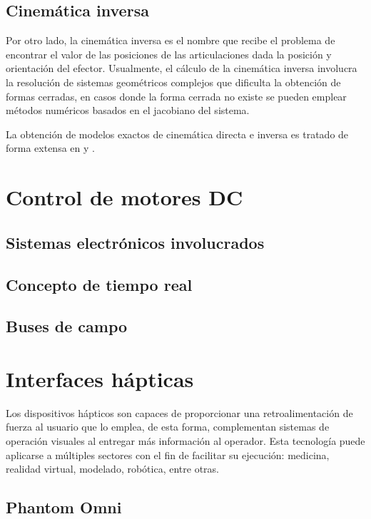\subsection{Cinemática inversa}

Por otro lado, la cinemática inversa es el nombre que recibe el problema de encontrar el valor de las posiciones de las articulaciones dada la posición y orientación del efector.
Usualmente, el cálculo de la cinemática inversa involucra la resolución de sistemas geométricos complejos que dificulta la obtención de formas cerradas, en casos donde la forma cerrada no existe se pueden emplear métodos numéricos basados en el jacobiano del sistema.

La obtención de modelos exactos de cinemática directa e inversa es tratado de forma extensa en \cite{cole2007} y \cite{predescu2015}.

\section{Control de motores DC}

\subsection{Sistemas electrónicos involucrados}

\subsection{Concepto de tiempo real}

\subsection{Buses de campo}

\section{Interfaces hápticas}

Los dispositivos hápticos son capaces de proporcionar una retroalimentación de fuerza al usuario que lo emplea, de esta forma, complementan sistemas de operación visuales al entregar más información al operador. Esta tecnología puede aplicarse a múltiples sectores con el fin de facilitar su ejecución: medicina, realidad virtual, modelado, robótica, entre otras.

\subsection{Phantom Omni}

